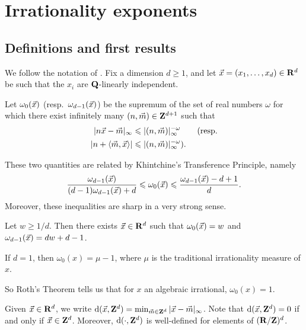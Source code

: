 
\chapter{Irrationality exponents}\label{chapter:irrationality-exponent}





\section{Definitions and first results}

We follow the notation of \cite{laurent-2009}. Fix a dimension 
$d\geqslant 1$, and let $\vec{x}=(x_1,\dots,x_d)\in \mathbf{R}^d$ be such that the $x_i$ 
are $\mathbf{Q}$-linearly independent. 

\begin{definition}\label{def:approx-exp}
Let $\omega_0(\vec{x})$ (resp.~$\omega_{d-1}(\vec{x})$) be the supremum of the set of 
real numbers $\omega$ for which there exist infinitely many 
$(n,\vec{m})\in \mathbf{Z}^{d+1}$ such that 
\begin{align*}
	|n \vec{x} - \vec{m}|_\infty 
		&\leqslant |(n,\vec{m})|_\infty^{-\omega}  \qquad\text{(resp.} \\
	|n +\langle \vec{m},\vec{x}\rangle| 
		&\leqslant |(n,\vec{m})|_\infty^{-\omega} \text{).}
\end{align*}
\end{definition}

These two quantities are related by Khintchine's Transference Principle, namely 
\[
	\frac{\omega_{d-1}(\vec{x})}{(d-1) \omega_{d-1}(\vec{x})+d} \leqslant \omega_0(\vec{x}) \leqslant \frac{\omega_{d-1}(\vec{x})-d+1}{d} .
\]
Moreover, these inequalities are sharp in a very strong sense. 

\begin{theorem}[Jarn\'ik]\label{thm:jarnik}
Let $w\geqslant 1/d$. Then there exists $\vec{x}\in \mathbf{R}^d$ such that 
$\omega_0(\vec{x})=w$ and $\omega_{d-1}(\vec{x}) = d w+d-1$. 
\end{theorem}

\begin{theorem}
If $d=1$, then $\omega_0(x) = \mu-1$, where $\mu$ is the traditional 
irrationality measure of $x$. 
\end{theorem}

So Roth's Theorem tells us that for $x$ an algebraic irrational, 
$\omega_0(x) = 1$. 

Given $\vec{x}\in \mathbf{R}^d$, we write 
$\mathrm{d}(\vec{x},\mathbf{Z}^d)=\min_{\vec{m}\in \mathbf{Z}^d} |\vec{x}-\vec{m}|_\infty$. Note that 
$\mathrm{d}(\vec{x},\mathbf{Z}^d)=0$ if and only if $\vec{x}\in \mathbf{Z}^d$. Moreover, $\mathrm{d}(\cdot,\mathbf{Z}^d)$ 
is well-defined for elements of $(\mathbf{R}/\mathbf{Z})^d$. 

